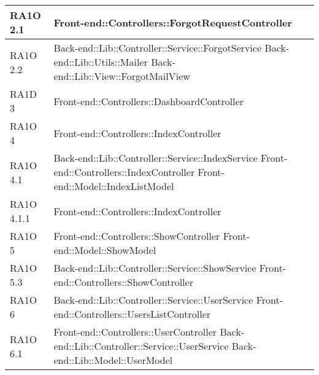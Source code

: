 \begin{center}
\begin{longtable}{ | p{3cm} | p{11cm} | }
    RA1O 2.1 & Front-end::Controllers::ForgotRequestController \newline  \\ \hline   
       
    RA1O 2.2 & Back-end::Lib::Controller::Service::ForgotService \newline
    			  			Back-end::Lib::Utils::Mailer \newline
    			  			Back-end::Lib::View::ForgotMailView \newline  \\ \hline     
    			   
     
    RA1D 3 & Front-end::Controllers::DashboardController \newline  \\ \hline  
        
    RA1O 4 & Front-end::Controllers::IndexController \newline  \\ \hline   
       
    RA1O 4.1 & Back-end::Lib::Controller::Service::IndexService \newline Front-end::Controllers::IndexController \newline Front-end::Model::IndexListModel \newline  \\ \hline   
       
    RA1O 4.1.1 & Front-end::Controllers::IndexController \newline  \\ \hline 
         
    RA1O 5 & Front-end::Controllers::ShowController \newline
    			 Front-end::Model::ShowModel \newline  \\ \hline    
           
    RA1O 5.3 & Back-end::Lib::Controller::Service::ShowService \newline
    			 Front-end::Controllers::ShowController\newline  \\ \hline      
    
    RA1O 6 & Back-end::Lib::Controller::Service::UserService \newline Front-end::Controllers::UsersListController  \\ \hline  
        
    RA1O 6.1 & Front-end::Controllers::UserController \newline Back-end::Lib::Controller::Service::UserService \newline Back-end::Lib::Model::UserModel \\ \hline   
       

\end{longtable}
\end{center}
